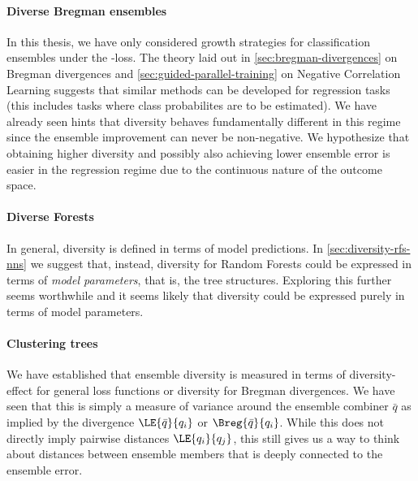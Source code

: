 \documentclass[
	twoside=false, %
]{kaobook}
\begin{document}
\paragraph{Diverse Bregman ensembles} In this thesis, we have only considered growth strategies for classification ensembles under the \zeroone-loss. The theory laid out in \cref{sec:bregman-divergences} on Bregman divergences and \cref{sec:guided-parallel-training} on Negative Correlation Learning suggests that similar methods can be developed for regression tasks (this includes tasks where class probabilites are to be estimated). We have already seen hints that diversity behaves fundamentally different in this regime since the ensemble improvement can never be non-negative. We hypothesize that obtaining higher diversity and possibly also achieving lower ensemble error is easier in the regression regime due to the continuous nature of the outcome space. 


\paragraph{Diverse Forests}
In general, diversity is defined in terms of model predictions. In \cref{sec:diversity-rfs-nns} we suggest that, instead, diversity for Random Forests could be expressed in terms of \textit{model parameters}, that is, the tree structures. Exploring this further seems worthwhile and it seems likely that diversity could be expressed purely in terms of model parameters. 

\paragraph{Clustering trees}
We have established that ensemble diversity is measured in terms of diversity-effect for general loss functions or diversity for Bregman divergences. We have seen that this is simply a measure of variance around the ensemble combiner $\bar{q}$ as implied by the divergence $\LE{\bar{q}}{q_{i}}$ or $\Breg{\bar{q}}{q_{i}}$. 
While this does not directly imply pairwise distances $\LE{q_{i}}{q_{j}}$, this still gives us a way to think about distances between ensemble members that is deeply connected to the ensemble error.
\end{document}
